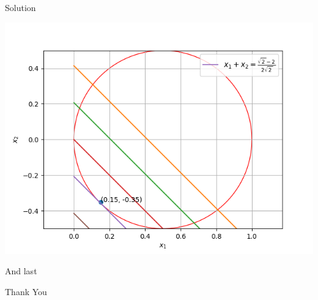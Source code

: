 \documentclass{beamer}
\begin{document}
\begin{frame}{Solution}
\begin{center}
    \includegraphics[scale=0.5]{Figure_1.png}
\end{center}
\end{frame}

\begin{frame}{And last}
\begin{center}
    Thank You
\end{center}
\end{frame}
\end{document}
